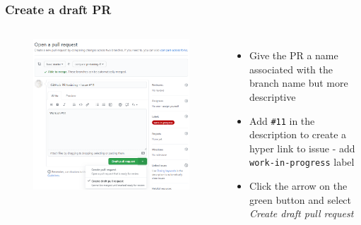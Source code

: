 \documentclass[aspectratio=169]{beamer} %
\begin{document}
\begin{frame}
	\frametitle{Create a draft PR}
	\begin{columns}[c]

		\vspace{-.5cm}
		\begin{figure}
			\centering
			\includegraphics[width=\textwidth]{./img/create-pr-1.png}
		\end{figure}


		\begin{itemize}
			\setlength\itemsep{.5em}
			\item Give the PR a name associated with
			the branch name but more descriptive
			\item Add \texttt{\#11} in the description
			to create a hyper link to issue
			- add \texttt{work-in-progress} label
			\item Click the arrow on the green button and
			select \textit{Create draft pull request}
		\end{itemize}

	\end{columns}
\end{frame}
\end{document}
